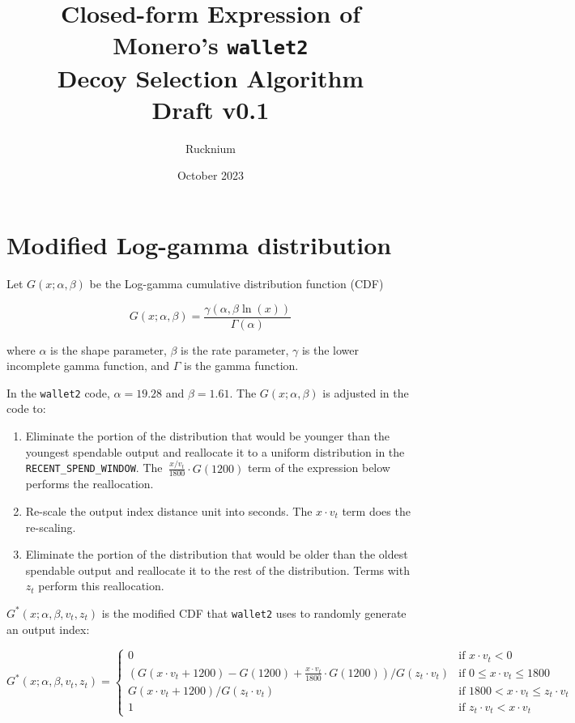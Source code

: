 \documentclass{article}
\begin{document}
\title{Closed-form Expression of Monero's \texttt{wallet2}\\Decoy Selection Algorithm\\\vspace{.3cm}
\large Draft v0.1\vspace{-.715cm}}
\author{Rucknium }
\date{October 2023}


\maketitle

\section{Modified Log-gamma distribution}

Let $G(x;\alpha,\beta)$ be the Log-gamma cumulative distribution
function (CDF)

\begin{equation}
G(x;\alpha,\beta)=\dfrac{\gamma\left(\alpha,\beta\ln\left(x\right)\right)}{\Gamma\left(\alpha\right)}
\end{equation}

where $\alpha$ is the shape parameter, $\beta$ is the rate parameter,
$\gamma$ is the lower incomplete gamma function, and $\Gamma$ is
the gamma function.

In the \texttt{wallet2} code, $\alpha=19.28$ and $\beta=1.61$. The
$G(x;\alpha,\beta)$ is adjusted in the code to:
\begin{enumerate}
\item Eliminate the portion of the distribution that would be younger than
the youngest spendable output and reallocate it to a uniform distribution
in the \texttt{RECENT\_SPEND\_WINDOW}. The\texttt{ $\frac{x/v_{t}}{1800}\cdot G(1200)$}
term of the expression below performs the reallocation.
\item Re-scale the output index distance unit into seconds. The $x\cdot v_{t}$
term does the re-scaling.
\item Eliminate the portion of the distribution that would be older than
the oldest spendable output and reallocate it to the rest of the distribution.
Terms with $z_{t}$ perform this reallocation.
\end{enumerate}
$G^{*}(x;\alpha,\beta,v_{t},z_{t})$ is the modified CDF that \texttt{wallet2}
uses to randomly generate an output index:

\begin{equation}
G^{*}(x;\alpha,\beta,v_{t},z_{t})=\begin{cases}
0 & \textrm{if }x\cdot v_{t}<0\\
\left(G(x\cdot v_{t}+1200)-G(1200)+\frac{x\cdot v_{t}}{1800}\cdot G(1200)\right)/G\left(z_{t}\cdot v_{t}\right) & \textrm{if }0\leq x\cdot v_{t}\leq1800\\
G\left(x\cdot v_{t}+1200\right)/G\left(z_{t}\cdot v_{t}\right) & \textrm{if }1800<x\cdot v_{t}\leq z_{t}\cdot v_{t}\\
1 & \textrm{if }z_{t}\cdot v_{t}<x\cdot v_{t}
\end{cases}
\end{equation}
\end{document}
